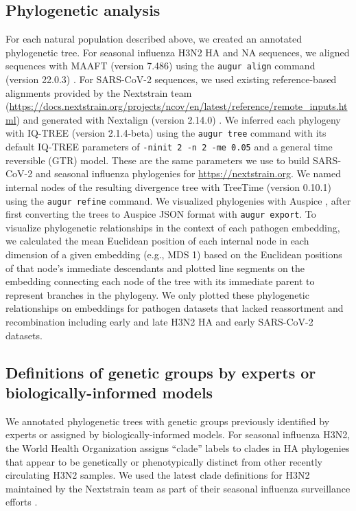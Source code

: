 \documentclass[webpdf,contemporary,large,single]{oup-authoring-template}%
\theoremstyle{thmstyleone}%
\theoremstyle{thmstyletwo}%
\theoremstyle{thmstylethree}%
\begin{document}
\subsection{Phylogenetic analysis}

For each natural population described above, we created an annotated phylogenetic tree.
For seasonal influenza H3N2 HA and NA sequences, we aligned sequences with MAAFT (version 7.486) \citep{Katoh2002,Katoh2013} using the \texttt{augur align} command (version 22.0.3) \citep{Huddleston2021}.
For SARS-CoV-2 sequences, we used existing reference-based alignments provided by the Nextstrain team (\href{https://docs.nextstrain.org/projects/ncov/en/latest/reference/remote_inputs.html#summary-of-available-genbank-open-files}{https://docs.nextstrain.org/projects/ncov/en/latest/reference/remote\_inputs.html}) and generated with Nextalign (version 2.14.0) \citep{Aksamentov2021}.
We inferred each phylogeny with IQ-TREE (version 2.1.4-beta) \citep{Nguyen2014} using the \texttt{augur tree} command with its default IQ-TREE parameters of \texttt{-ninit 2 -n 2 -me 0.05} and a general time reversible (GTR) model.
These are the same parameters we use to build SARS-CoV-2 and seasonal influenza phylogenies for \href{nextstrain.org}{https://nextstrain.org}.
We named internal nodes of the resulting divergence tree with TreeTime (version 0.10.1) \citep{Sagulenko2018} using the \texttt{augur refine} command.
We visualized phylogenies with Auspice \citep{Hadfield2018}, after first converting the trees to Auspice JSON format with \texttt{augur export}.
To visualize phylogenetic relationships in the context of each pathogen embedding, we calculated the mean Euclidean position of each internal node in each dimension of a given embedding (e.g., MDS 1) based on the Euclidean positions of that node's immediate descendants and plotted line segments on the embedding connecting each node of the tree with its immediate parent to represent branches in the phylogeny.
We only plotted these phylogenetic relationships on embeddings for pathogen datasets that lacked reassortment and recombination including early and late H3N2 HA and early SARS-CoV-2 datasets.

\subsection{Definitions of genetic groups by experts or biologically-informed models}

We annotated phylogenetic trees with genetic groups previously identified by experts or assigned by biologically-informed models.
For seasonal influenza H3N2, the World Health Organization assigns ``clade'' labels to clades in HA phylogenies that appear to be genetically or phenotypically distinct from other recently circulating H3N2 samples.
We used the latest clade definitions for H3N2 maintained by the Nextstrain team as part of their seasonal influenza surveillance efforts \citep{Neher2015}.
\end{document}
